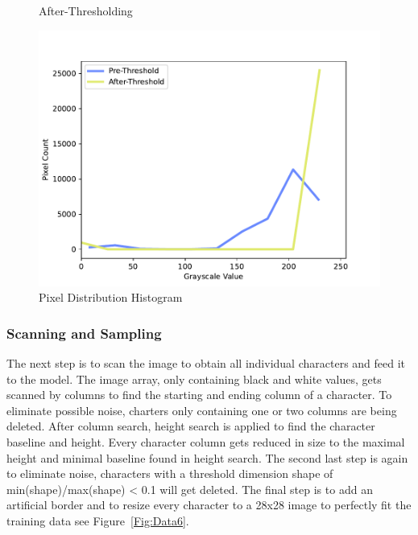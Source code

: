 \documentclass[@CLASSOPTIONS@]{tumarticle}
\begin{document}
\begin{figure}[!htb]
   \begin{minipage}{0.48\textwidth}
     \centering
     \caption{After-Thresholding}\label{Fig:Data4}
   \end{minipage}
  \hfill
   \begin{minipage}{0.48\textwidth}
     \centering
     \includegraphics[width=.9\linewidth]{figures/histogram}
     \caption{Pixel Distribution Histogram}\label{Fig:Data5}
   \end{minipage}
\end{figure}

\subsubsection{Scanning and Sampling}

The next step is to scan the image to obtain all individual characters and feed it to the model.
The image array, only containing black and white values, gets scanned by columns to find the starting
and ending column of a character.
To eliminate possible noise, charters only containing one or two columns are being deleted.
After column search, height search is applied to find the character baseline and height.
Every character column gets reduced in size to the maximal height and minimal baseline found in height search.
The second last step is again to eliminate noise, characters with a threshold dimension shape of
min(shape)/max(shape) < 0.1 will get deleted.
The final step is to add an artificial border and to resize every character to a 28x28 image to
perfectly fit the training data see Figure~\ref{Fig:Data6}.
\end{document}
